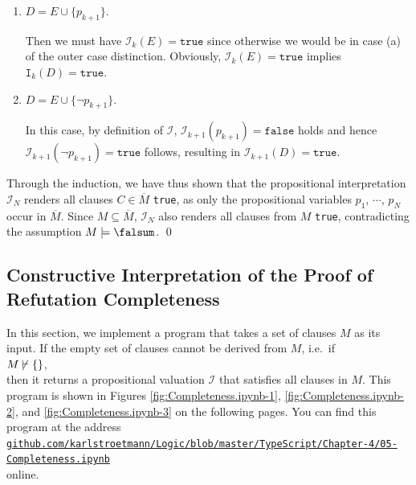\begin{enumerate}
\begin{enumerate}
\begin{enumerate}[1.]
          In this case, $\mathcal{I}_{k+1} = \mathtt{true}$ already holds by the induction hypothesis.        
    \item $D = E \cup \{ p_{k+1} \}$.

          Then we must have $\mathcal{I}_k(E) = \mathtt{true}$ since otherwise we would be in case (a) of the
          outer case distinction.  Obviously, $\mathcal{I}_k(E) = \mathtt{true}$ implies $\mathtt{I}_k(D) = \mathtt{true}$.
    \item $D = E \cup \{ \neg p_{k+1} \}$.

          In this case, by definition of $\mathcal{I}$, $\mathcal{I}_{k+1}(p_{k+1}) = \mathtt{false}$
          holds and hence $\mathcal{I}_{k+1}(\neg p_{k+1}) = \mathtt{true}$ follows, resulting in
          $\mathcal{I}_{k+1}(D) = \mathtt{true}$.
    \end{enumerate}
    
    Through the induction, we have thus shown that the propositional interpretation
    $\mathcal{I}_{N}$ renders all clauses $C \in \overline{M}$ \texttt{true}, as only the
    propositional variables $p_1$, $\cdots$, $p_N$ occur in $\overline{M}$.
    Since $M \subseteq \overline{M}$, $\mathcal{I}_{N}$ also renders all clauses from $M$ \texttt{true}, 
    contradicting the assumption $M \models \falsum$. \qed
  \end{enumerate}
\end{enumerate}

\subsection{Constructive Interpretation of the Proof of Refutation Completeness}
In this section, we implement a program that takes a set of clauses $M$ as its input.
If the empty set of clauses cannot be derived from $M$, i.e.~if
\\[0.2cm]
\hspace*{1.3cm}
$M\, {\not}\!\vdash \{\}$,
\\[0.2cm]
then it returns a propositional valuation $\mathcal{I}$ that satisfies all clauses in $M$.
This program is shown in Figures \ref{fig:Completeness.ipynb-1}, \ref{fig:Completeness.ipynb-2}, and \ref{fig:Completeness.ipynb-3} on the following pages. You can find this program at the address
\\[0.2cm]
\hspace*{-0.1cm}
\href{https://github.com/karlstroetmann/Logic/blob/master/TypeScript/Chapter-4/05-Completeness.ipynb}{\texttt{github.com/karlstroetmann/Logic/blob/master/TypeScript/Chapter-4/05-Completeness.ipynb}}
\\[0.2cm]
online.

